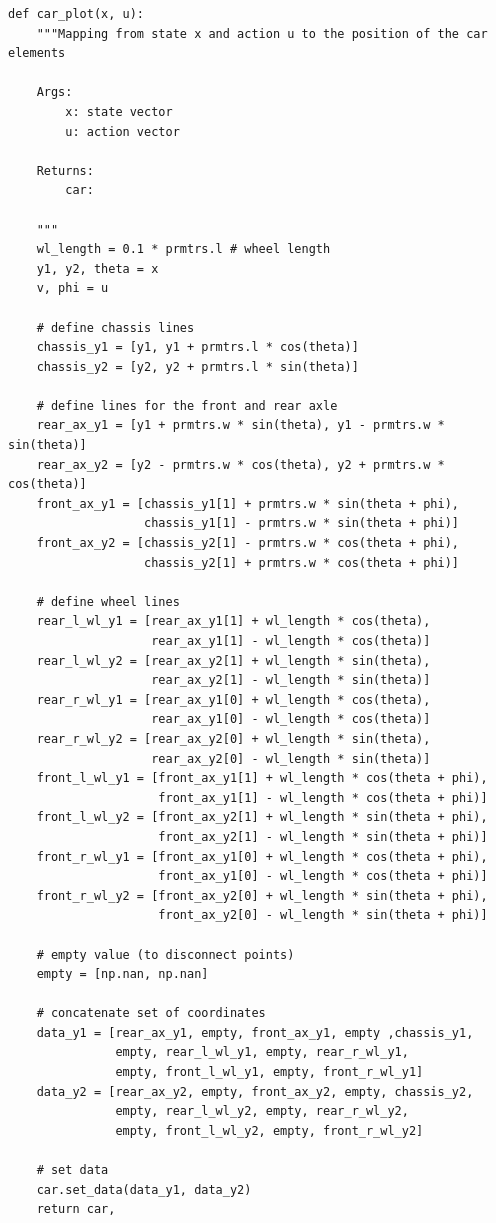 \documentclass[a4paper,11pt,headings=standardclasses]{scrartcl}%
\begin{document}
\begin{lstlisting}
def car_plot(x, u):
    """Mapping from state x and action u to the position of the car elements

    Args:
        x: state vector
        u: action vector

    Returns:
        car:

    """
    wl_length = 0.1 * prmtrs.l # wheel length
    y1, y2, theta = x
    v, phi = u

    # define chassis lines
    chassis_y1 = [y1, y1 + prmtrs.l * cos(theta)]
    chassis_y2 = [y2, y2 + prmtrs.l * sin(theta)]

    # define lines for the front and rear axle
    rear_ax_y1 = [y1 + prmtrs.w * sin(theta), y1 - prmtrs.w * sin(theta)]
    rear_ax_y2 = [y2 - prmtrs.w * cos(theta), y2 + prmtrs.w * cos(theta)]
    front_ax_y1 = [chassis_y1[1] + prmtrs.w * sin(theta + phi),
                   chassis_y1[1] - prmtrs.w * sin(theta + phi)]
    front_ax_y2 = [chassis_y2[1] - prmtrs.w * cos(theta + phi),
                   chassis_y2[1] + prmtrs.w * cos(theta + phi)]

    # define wheel lines
    rear_l_wl_y1 = [rear_ax_y1[1] + wl_length * cos(theta),
                    rear_ax_y1[1] - wl_length * cos(theta)]
    rear_l_wl_y2 = [rear_ax_y2[1] + wl_length * sin(theta),
                    rear_ax_y2[1] - wl_length * sin(theta)]
    rear_r_wl_y1 = [rear_ax_y1[0] + wl_length * cos(theta),
                    rear_ax_y1[0] - wl_length * cos(theta)]
    rear_r_wl_y2 = [rear_ax_y2[0] + wl_length * sin(theta),
                    rear_ax_y2[0] - wl_length * sin(theta)]
    front_l_wl_y1 = [front_ax_y1[1] + wl_length * cos(theta + phi),
                     front_ax_y1[1] - wl_length * cos(theta + phi)]
    front_l_wl_y2 = [front_ax_y2[1] + wl_length * sin(theta + phi),
                     front_ax_y2[1] - wl_length * sin(theta + phi)]
    front_r_wl_y1 = [front_ax_y1[0] + wl_length * cos(theta + phi),
                     front_ax_y1[0] - wl_length * cos(theta + phi)]
    front_r_wl_y2 = [front_ax_y2[0] + wl_length * sin(theta + phi),
                     front_ax_y2[0] - wl_length * sin(theta + phi)]
                     
    # empty value (to disconnect points)
    empty = [np.nan, np.nan]
   
    # concatenate set of coordinates
    data_y1 = [rear_ax_y1, empty, front_ax_y1, empty ,chassis_y1,
               empty, rear_l_wl_y1, empty, rear_r_wl_y1,
               empty, front_l_wl_y1, empty, front_r_wl_y1]
    data_y2 = [rear_ax_y2, empty, front_ax_y2, empty, chassis_y2,
               empty, rear_l_wl_y2, empty, rear_r_wl_y2,
               empty, front_l_wl_y2, empty, front_r_wl_y2]

    # set data
    car.set_data(data_y1, data_y2)
    return car,
\end{lstlisting}
\end{document}
